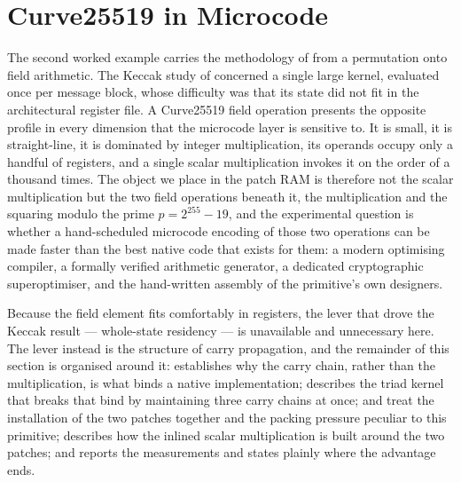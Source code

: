 %
%

\section{Curve25519 in Microcode}
\label{sec:curve25519}

The second worked example carries the methodology of  from
a permutation onto field arithmetic. The Keccak study of 
concerned a single large kernel, evaluated once per message block, whose
difficulty was that its state did not fit in the architectural register file. A
Curve25519 field operation presents the opposite profile in every dimension that
the microcode layer is sensitive to. It is small, it is straight-line, it is
dominated by integer multiplication, its operands occupy only a handful of
registers, and a single scalar multiplication invokes it on the order of a
thousand times. The object we place in the patch RAM is therefore not the scalar
multiplication but the two field operations beneath it, the multiplication and
the squaring modulo the prime $p = 2^{255}-19$, and the experimental question is
whether a hand-scheduled microcode encoding of those two operations can be made
faster than the best native code that exists for them: a modern optimising
compiler, a formally verified arithmetic generator, a dedicated cryptographic
superoptimiser, and the hand-written assembly of the primitive's own designers.

Because the field element fits comfortably in registers, the lever that drove
the Keccak result --- whole-state residency --- is unavailable and unnecessary
here. The lever instead is the structure of carry propagation, and the remainder
of this section is organised around it:  establishes why
the carry chain, rather than the multiplication, is what binds a native
implementation;  describes the triad kernel that breaks
that bind by maintaining three carry chains at once; 
and  treat the installation of the two patches together
and the packing pressure peculiar to this primitive; 
describes how the inlined scalar multiplication is built around the two patches;
and  reports the measurements and states plainly where the
advantage ends.

